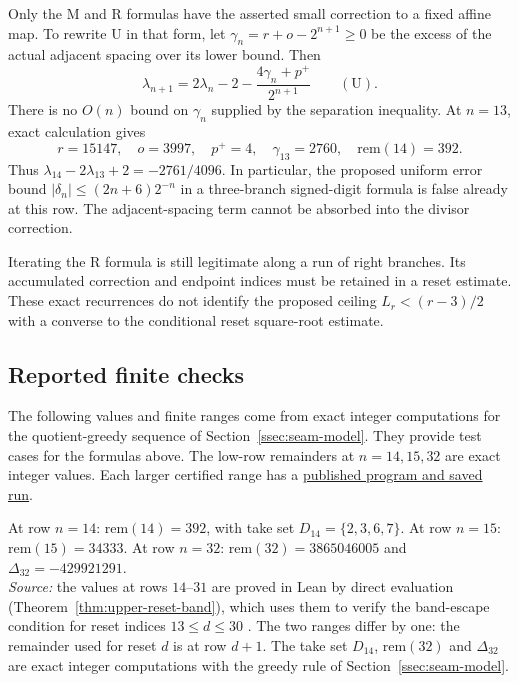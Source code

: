 Only the $\mathrm M$ and $\mathrm R$ formulas have the asserted
small correction to a fixed affine map.  To rewrite $\mathrm U$
in that form, let
$\gamma_n=r+o-2^{n+1}\ge0$ be the excess of the actual adjacent
spacing over its lower bound.  Then
\[
 \lambda_{n+1}=2\lambda_n-2-
                   \frac{4\gamma_n+p^+}{2^{n+1}}\qquad(\mathrm U).
\]
There is no $O(n)$ bound on $\gamma_n$ supplied by the separation
inequality.  At $n=13$, exact calculation gives
\[
 r=15147,\quad o=3997,\quad p^+=4,\quad
 \gamma_{13}=2760,\quad \mathrm{rem}(14)=392.
\]
Thus $\lambda_{14}-2\lambda_{13}+2=-2761/4096$.
In particular, the proposed uniform error bound
$|\delta_n|\le(2n+6)2^{-n}$ in a three-branch signed-digit formula
is false already at this row.  The adjacent-spacing term cannot
be absorbed into the divisor correction.

Iterating the $\mathrm R$ formula is still legitimate along a run
of right branches.  Its accumulated correction and endpoint indices
must be retained in a reset estimate.  These exact recurrences do
not identify the proposed ceiling $L_r<(r-3)/2$ with a converse to
the conditional reset square-root estimate.

\subsection{Reported finite checks}
\label{ssec:anchors}

The following values and finite ranges come from exact integer
computations for the quotient-greedy sequence of Section~\ref{ssec:seam-model}.
They provide test cases for the formulas above. The low-row remainders
at $n=14,15,32$ are exact integer values. Each larger certified range has a
\href{https://github.com/wcook04/plectis-erdos/tree/f757115e03bebe5c04431a147da559015c680a37/research/experiments/erdos257}{published program and saved run}.

\begin{obs}
\label{obs:anchors-low}
At row $n=14$: $\mathrm{rem}(14) = 392$, with take set $D_{14} = \{2,3,6,7\}$. At row $n=15$:
$\mathrm{rem}(15) = 34333$. At row $n=32$: $\mathrm{rem}(32) = 3865046005$ and $\Delta_{32} =
-429921291$.\\
\textit{Source:} the values at rows $14$--$31$ are proved in Lean by direct
evaluation (Theorem~\ref{thm:upper-reset-band}), which uses them to verify the
band-escape condition for reset indices $13\le d\le30$
.
The two ranges differ by one: the remainder used for reset $d$ is at
row $d+1$. The take set $D_{14}$, $\mathrm{rem}(32)$ and $\Delta_{32}$ are
exact integer computations with the greedy rule of Section~\ref{ssec:seam-model}.
\end{obs}


